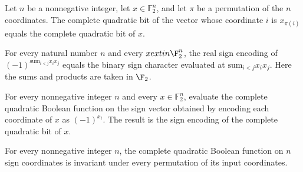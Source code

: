 \begin{theorem}
\label{FABL.completeQuadraticBit_comp_perm}
\leanok
{}
Let $n$ be a nonnegative integer, let $x\in\mathbb{F}_2^n$, and let $\pi$ be a
permutation of the $n$ coordinates. The complete quadratic bit of the vector whose
coordinate $i$ is $x_{\pi(i)}$ equals the complete quadratic bit of $x$.
\end{theorem}

\begin{theorem}
\label{FABL.completeQuadratic_apply}
\leanok
{}
For every natural number $n$ and every $x	ext{in }\F_2^n$, the real sign encoding of
$(-1)^{\text{sum}_{i<j}x_i x_j}$ equals the binary sign character evaluated at
$\text{sum}_{i<j}x_i x_j$. Here the sums and products are taken in $\F_2$.
\end{theorem}

\begin{theorem}
\label{FABL.completeQuadraticBoolean_binaryCubeSignEquiv}
\leanok
{}
For every nonnegative integer $n$ and every $x\in\mathbb{F}_2^n$, evaluate the complete
quadratic Boolean function on the sign vector obtained by encoding each coordinate of
$x$ as $(-1)^{x_i}$. The result is the sign encoding of the complete quadratic bit of
$x$.
\end{theorem}

\begin{theorem}
\label{FABL.completeQuadraticBoolean_isSymmetric}
\leanok
{}
For every nonnegative integer $n$, the complete quadratic Boolean function on $n$ sign
coordinates is invariant under every permutation of its input coordinates.
\end{theorem}

